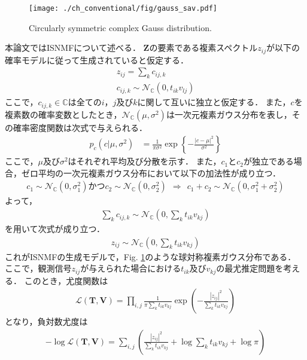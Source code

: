 \begin{figure}[!b]
\centering
\texttt{[image: ./ch\_conventional/fig/gauss\_sav.pdf]}
\caption{Circularly symmetric complex Gauss distribution.}
\label{fig:gauss}
\end{figure}

本論文ではISNMF\cite{isnmf}について述べる．
$\bm{Z}$の要素である複素スペクトル$z_{ij}$が以下の確率モデルに従って生成されていると仮定する．
\begin{align}
    z_{ij} = \sum_k c_{ij,k} \\
    c_{ij,k} \sim \mathcal{N}_{\mathbb{C}} (0, t_{ik}v_{lj})
\end{align}
ここで，$c_{ij,k} \in \mathbb{C}$は全ての$i$，$j$及び$k$に関して互いに独立と仮定する．
また，$c$を複素数の確率変数としたとき，$\mathcal{N}_{\mathbb{C}} (\mu, \sigma^2)$は一次元複素ガウス分布を表し，その確率密度関数は次式で与えられる．
\begin{align}
    p_c(c | \mu, \sigma^2) &= \frac{1}{\pi \sigma^2} \exp \left\{ -\frac{|c-\mu|^2}{\sigma^2} \right\}
\end{align}
ここで，$\mu$及び$\sigma^2$はそれぞれ平均及び分散を示す．
また，$c_1$と$c_2$が独立である場合，ゼロ平均の一次元複素ガウス分布において以下の加法性が成り立つ．
\begin{align}
    c_1 \sim \mathcal{N}_{\mathbb{C}}(0,\sigma_1^2)かつc_2 \sim \mathcal{N}_{\mathbb{C}}(0,\sigma_2^2) ~~ \Longrightarrow ~~ c_1 + c_2 \sim \mathcal{N}_{\mathbb{C}}(0,\sigma_1^2 + \sigma_2^2)
\end{align}
よって，
\begin{align}
    \sum_k c_{ij,k} \sim \mathcal{N}_{\mathbb{C}}\left( 0, \sum_k t_{ik} v_{kj} \right)
\end{align}
を用いて次式が成り立つ．
\begin{align}
    z_{ij} \sim \mathcal{N}_{\mathbb{C}}\left( 0, \sum_k t_{ik} v_{kj} \right) \label{eq:nmfgen}
\end{align}
これがISNMFの生成モデルで，Fig. \ref{fig:gauss}のような球対称複素ガウス分布である．
ここで，観測信号$z_{ij}$が与えられた場合における$t_{ik}$及び$v_{kj}$の最尤推定問題を考える．
このとき，尤度関数は
\begin{align}
    \mathcal{L}(\bm{T}, \bm{V}) = \prod_{i,j} \frac{1}{\pi \sum_k t_{ik} v_{kj} } \exp \left( -\frac{|z_{ij}|^2}{\sum_k t_{ik} v_{kj}} \right)
\end{align}
となり，負対数尤度は
\begin{align}
    -\log\mathcal{L}(\bm{T}, \bm{V}) = \sum_{i,j} \left( \frac{|z_{ij}|^2}{\sum_k t_{ik} v_{kj}} + \log \sum_k t_{ik} v_{kj} + \log \pi \right)
\end{align}
